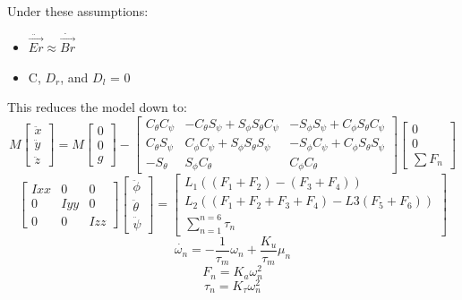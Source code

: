 \documentclass[12pt,a4paper,twoside]{report}
\begin{document}
			Under these assumptions:
			\begin{itemize}
				\item
					$\ddot{\vec{Er}} \approx \dot{\vec{Br}} $
				\item
					C, $D_r$, and $D_l$ = 0
			\end{itemize}
			\space
			This reduces the model down to:
			$$ 
				M 
				\begin{bmatrix}
				\ddot{x} \\
				\ddot{y} \\
				\ddot{z}
				\end{bmatrix}
				=
				M 
				\begin{bmatrix}
				0 \\
				0 \\
				g
				\end{bmatrix}
				-
				\begin{bmatrix}
				C_\theta C_\psi & -C_\theta S_\psi + S_\phi S_\theta C_\psi & -S_\phi S_\psi + C_\phi S_\theta C_\psi \\
				C_\theta S_\psi &  C_\phi C_\psi + S_\phi S_\theta S_\psi   & -S_\phi C_\psi + C_\phi S_\theta S_\psi \\
				-S_\theta       &  S_\phi C_\theta                          &  C_\phi C_\theta
				\end{bmatrix}
				\begin{bmatrix}
				0 \\
				0 \\
				\sum F_n 
				\end{bmatrix}
			$$
			$$ 
				\begin{bmatrix}
				Ixx & 0 & 0 \\
				0 & Iyy & 0 \\
				0 & 0 & Izz
				\end{bmatrix}
				\begin{bmatrix}
				\ddot{\phi} \\
				\ddot{\theta} \\
				\ddot{\psi}
				\end{bmatrix}
				=
				\begin{bmatrix}
				L_1 ((F_1+F_2) - (F_3+F_4)) \\
				L_2 ((F_1+F_2+F_3+F_4) - L3 (F_5+F_6)) \\
				\sum_{n = 1}^{n = 6}\tau_n
				\end{bmatrix}
			$$ 
				\[\dot{\omega_n} = -\frac{1}{\tau_m}\omega_n	 + \frac{K_u}{\tau_m}\mu_n\]
				\[ F_n = K_a \omega_n^2\]
				\[\tau_n = K_\tau \omega_n^2 \]
				\\
\end{document}
